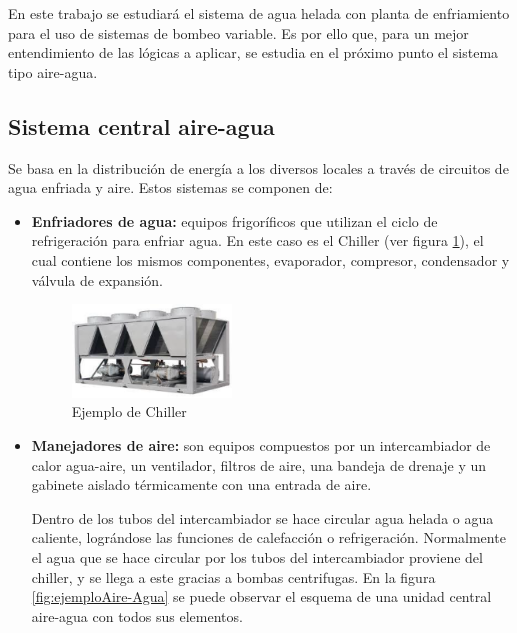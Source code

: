 En este trabajo se estudiará el sistema de agua helada con planta de enfriamiento para el uso de sistemas de bombeo variable. Es por ello que, para un mejor entendimiento de las lógicas a aplicar, se estudia en el próximo punto el sistema tipo aire-agua.

\subsection{Sistema central aire-agua}
Se basa en la distribución de energía a los diversos locales a través de circuitos de agua enfriada y aire. Estos sistemas se componen de:
\begin{itemize}
 \item \textbf{Enfriadores de agua:}
 equipos frigoríficos que utilizan el ciclo de refrigeración para enfriar agua. En este caso es el Chiller (ver figura \ref{fig:ejemploChiller}), el cual contiene los mismos componentes, evaporador, compresor, condensador y  válvula de expansión.
 
 \begin{figure}[H]
    \centering
    \includegraphics[width=0.40\textwidth]{2_MainMatter/Capitulo2/Imagenes/Chiller.PNG}
    \caption{Ejemplo de Chiller\cite{Sistemadividido}}
    \label{fig:ejemploChiller}
\end{figure}

 \item \textbf{Manejadores de aire:}
  son equipos compuestos por un intercambiador de calor agua-aire, un ventilador, filtros de aire, una bandeja de drenaje y un gabinete aislado térmicamente con una entrada de aire.
  
  Dentro de los tubos del intercambiador se hace circular agua helada o agua caliente, lográndose las funciones de calefacción o refrigeración. Normalmente el agua que se hace circular por los tubos del intercambiador proviene del chiller, y se llega a este gracias a bombas centrifugas.  En la figura \ref{fig:ejemploAire-Agua} se puede observar el esquema de una unidad central aire-agua con todos sus elementos.
  

\end{itemize}
